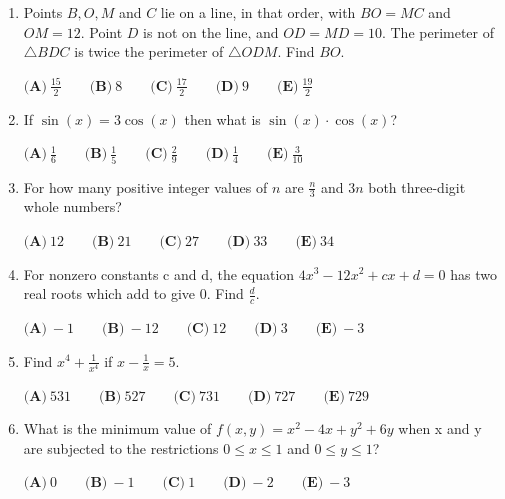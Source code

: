 \documentclass[12pt]{article}
\begin{document}
\begin{enumerate}
     \item Points $B,O,M$ and $C$ lie on a line, in that order, with $BO = MC$ and $OM = 12$. Point $D$ is not on the line, and $OD = MD = 10$. The perimeter of $\triangle BDC$ is twice the perimeter of $\triangle ODM$. Find $BO$.

    $\textbf{(A)}\ \frac{15}{2} \qquad \textbf{(B)}\ 8 \qquad \textbf{(C)}\ \frac{17}{2}\qquad \textbf{(D)}\ 9\qquad \textbf{(E)}\ \frac{19}{2}$
        
     \item If $\sin(x) =3 \cos(x)$ then what is $\sin(x) \cdot \cos(x)$?

    $\textbf{(A)}\ \frac{1}{6} \qquad \textbf{(B)}\ \frac{1}{5} \qquad \textbf{(C)}\ \frac{2}{9}\qquad \textbf{(D)}\ \frac{1}{4}\qquad \textbf{(E)}\ \frac{3}{10}$
        
     \item For how many positive integer values of $n$ are $\frac{n}{3}$ and $3n$ both three-digit whole numbers?

    $\textbf{(A)}\ 12 \qquad \textbf{(B)}\ 21 \qquad \textbf{(C)}\ 27 \qquad \textbf{(D)}\ 33 \qquad \textbf{(E)}\ 34$
    
    \item For nonzero constants c and d, the equation $4x^3 - 12x^2 + cx + d = 0$ has two real roots which add to give 0. Find $\frac{d}{c}$.
    
    $\textbf{(A)}\ -1 \qquad \textbf{(B)}\ -12 \qquad \textbf{(C)}\ 12\qquad \textbf{(D)}\ 3\qquad \textbf{(E)}\ -3$
        
     \item Find $x^4 +\frac{1}{x^4}$ if $x-\frac{1}{x}=5.$

    $\textbf{(A)}\ 531 \qquad \textbf{(B)}\ 527 \qquad \textbf{(C)}\ 731\qquad \textbf{(D)}\ 727\qquad \textbf{(E)}\ 729$
        
     \item What is the minimum value of $f(x,y) = x^2 - 4x + y^2 + 6y$ when x and y are subjected to the restrictions $0 \leq x \leq 1$ and $0 \leq y \leq 1$?

     $\textbf{(A)}\ 0 \qquad \textbf{(B)}\ -1 \qquad \textbf{(C)}\ 1 \qquad \textbf{(D)}\ -2 \qquad \textbf{(E)}\ -3 $
    \end{enumerate}
    
\end{document}
